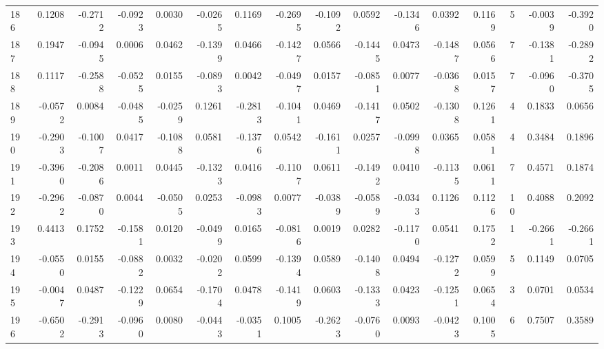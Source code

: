 \begin{tabular}{lrrrrrrrrrrrrrrr}
186 &      0.1208 & -0.2712 & -0.0923 &  0.0030 & -0.0265 &  0.1169 & -0.2695 & -0.1092 &  0.0592 & -0.1346 &   0.0392 &     0.1169 &      5 &                   -0.0039 &                    -0.3920 \\
187 &      0.1947 & -0.0945 &  0.0006 &  0.0462 & -0.1399 &  0.0466 & -0.1427 &  0.0566 & -0.1445 &  0.0473 &  -0.1487 &     0.0566 &      7 &                   -0.1381 &                    -0.2892 \\
188 &      0.1117 & -0.2588 & -0.0525 &  0.0155 & -0.0893 &  0.0042 & -0.0497 &  0.0157 & -0.0851 &  0.0077 &  -0.0368 &     0.0157 &      7 &                   -0.0960 &                    -0.3705 \\
189 &     -0.0572 &  0.0084 & -0.0485 & -0.0259 &  0.1261 & -0.2813 & -0.1041 &  0.0469 & -0.1417 &  0.0502 &  -0.1308 &     0.1261 &      4 &                    0.1833 &                     0.0656 \\
190 &     -0.2903 & -0.1007 &  0.0417 & -0.1088 &  0.0581 & -0.1376 &  0.0542 & -0.1611 &  0.0257 & -0.0998 &   0.0365 &     0.0581 &      4 &                    0.3484 &                     0.1896 \\
191 &     -0.3960 & -0.2086 &  0.0011 &  0.0445 & -0.1323 &  0.0416 & -0.1107 &  0.0611 & -0.1492 &  0.0410 &  -0.1135 &     0.0611 &      7 &                    0.4571 &                     0.1874 \\
192 &     -0.2962 & -0.0870 &  0.0044 & -0.0505 &  0.0253 & -0.0983 &  0.0077 & -0.0389 & -0.0589 & -0.0343 &   0.1126 &     0.1126 &     10 &                    0.4088 &                     0.2092 \\
193 &      0.4413 &  0.1752 & -0.1581 &  0.0120 & -0.0499 &  0.0165 & -0.0816 &  0.0019 &  0.0282 & -0.1170 &   0.0541 &     0.1752 &      1 &                   -0.2661 &                    -0.2661 \\
194 &     -0.0550 &  0.0155 & -0.0882 &  0.0032 & -0.0202 &  0.0599 & -0.1394 &  0.0589 & -0.1408 &  0.0494 &  -0.1272 &     0.0599 &      5 &                    0.1149 &                     0.0705 \\
195 &     -0.0047 &  0.0487 & -0.1229 &  0.0654 & -0.1704 &  0.0478 & -0.1419 &  0.0603 & -0.1333 &  0.0423 &  -0.1251 &     0.0654 &      3 &                    0.0701 &                     0.0534 \\
196 &     -0.6502 & -0.2913 & -0.0960 &  0.0080 & -0.0443 & -0.0351 &  0.1005 & -0.2623 & -0.0760 &  0.0093 &  -0.0423 &     0.1005 &      6 &                    0.7507 &                     0.3589 \\

\end{tabular}
